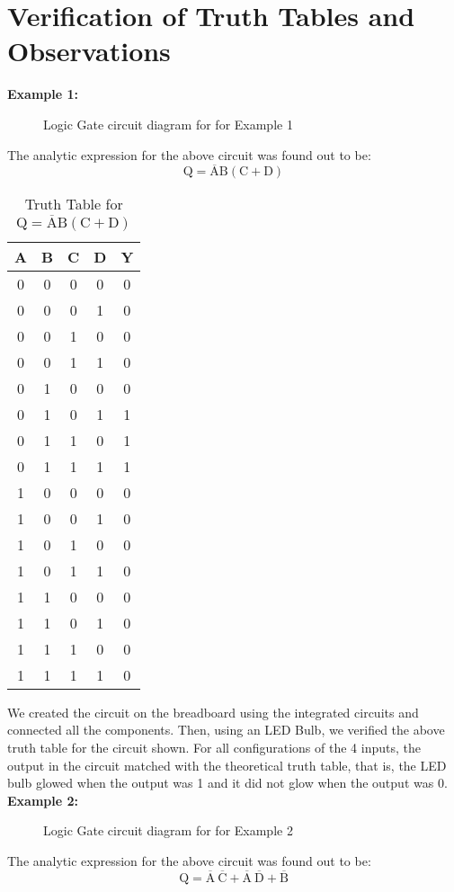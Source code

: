 \documentclass{scrartcl}
\begin{document}
 \section{Verification of Truth Tables and Observations}
\textbf{Example 1:}
\begin{figure}[H]
    \centering
    
    \caption{Logic Gate circuit diagram for for Example 1}
\end{figure}
The analytic expression for the above circuit was found out to be: $$\mathrm{Q = \overline{A}B(C+D)}$$
\begin{table}[H]
    \centering
    \caption{Truth Table for \( \mathrm{Q} = \overline{\mathrm{A}}\mathrm{B}(\mathrm{C + D}) \)}
    \vspace{0.2cm}
    \begin{tabular}{|c|c|c|c||c|}
    \hline
    \textbf{A} & \textbf{B} & \textbf{C} & \textbf{D} & \textbf{Y} \\
    \hline
    0 & 0 & 0 & 0 & 0 \\
    0 & 0 & 0 & 1 & 0 \\
    0 & 0 & 1 & 0 & 0 \\
    0 & 0 & 1 & 1 & 0 \\
    0 & 1 & 0 & 0 & 0 \\
    0 & 1 & 0 & 1 & 1 \\
    0 & 1 & 1 & 0 & 1 \\
    0 & 1 & 1 & 1 & 1 \\
    1 & 0 & 0 & 0 & 0 \\
    1 & 0 & 0 & 1 & 0 \\
    1 & 0 & 1 & 0 & 0 \\
    1 & 0 & 1 & 1 & 0 \\
    1 & 1 & 0 & 0 & 0 \\
    1 & 1 & 0 & 1 & 0 \\
    1 & 1 & 1 & 0 & 0 \\
    1 & 1 & 1 & 1 & 0 \\
    \hline
    \end{tabular}
    \end{table}
    \noindent
    We created the circuit on the breadboard using the integrated circuits and connected all the components. Then, using an LED Bulb, we verified the above truth table for the circuit shown. For all configurations of the 4 inputs, the output in the circuit matched with the theoretical truth table, that is, the LED bulb glowed when the output was 1 and it did not glow when the output was 0. \\[0.2cm]
    \textbf{Example 2:}  
    \begin{figure}[H]
    \centering
    
    \caption{Logic Gate circuit diagram for for Example 2}

\end{figure}
The analytic expression for the above circuit was found out to be: 
$$\mathrm{Q = \overline{A}\ \overline{C}+ \overline{A}\ \overline{D} + \overline{B}}$$
\end{document}
